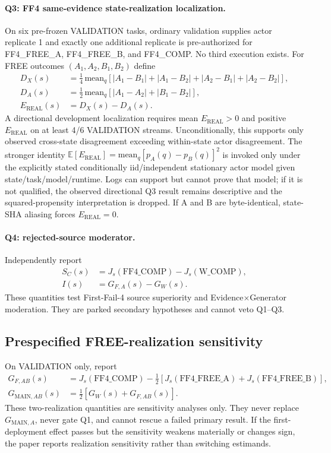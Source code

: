\paragraph{Q3: FF4 same-evidence state-realization localization.}
On six pre-frozen VALIDATION tasks, ordinary validation supplies actor replicate 1 and exactly one additional replicate is pre-authorized for FF4\_FREE\_A, FF4\_FREE\_B, and FF4\_COMP. No third execution exists. For FREE outcomes $(A_1,A_2,B_1,B_2)$ define
\begin{align}
D_X(s) &= \tfrac{1}{4}\,\mathrm{mean}_q\left[|A_1-B_1|+|A_1-B_2|+|A_2-B_1|+|A_2-B_2|\right],\\
D_A(s) &= \tfrac{1}{2}\,\mathrm{mean}_q\left[|A_1-A_2|+|B_1-B_2|\right],\\
E_{\mathrm{REAL}}(s) &= D_X(s)-D_A(s).
\end{align}
A directional development localization requires mean $E_{\mathrm{REAL}}>0$ and positive $E_{\mathrm{REAL}}$ on at least 4/6 VALIDATION streams. Unconditionally, this supports only observed cross-state disagreement exceeding within-state actor disagreement. The stronger identity $\mathbb{E}[E_{\mathrm{REAL}}]=\mathrm{mean}_q[p_A(q)-p_B(q)]^2$ is invoked only under the explicitly stated conditionally iid/independent stationary actor model given state/task/model/runtime. Logs can support but cannot prove that model; if it is not qualified, the observed directional Q3 result remains descriptive and the squared-propensity interpretation is dropped. If A and B are byte-identical, state-SHA aliasing forces $E_{\mathrm{REAL}}=0$.

\paragraph{Q4: rejected-source moderator.}
Independently report
\begin{align}
S_C(s) &= J_s(\text{FF4\_COMP})-J_s(\text{W\_COMP}),\\
I(s) &= G_{F,A}(s)-G_W(s).
\end{align}
These quantities test First-Fail-4 source superiority and Evidence$\times$Generator moderation. They are parked secondary hypotheses and cannot veto Q1--Q3.

\subsection{Prespecified FREE-realization sensitivity}
On VALIDATION only, report
\begin{align}
G_{F,AB}(s) &= J_s(\text{FF4\_COMP})-\tfrac{1}{2}[J_s(\text{FF4\_FREE\_A})+J_s(\text{FF4\_FREE\_B})],\\
G_{\mathrm{MAIN},AB}(s) &= \tfrac{1}{2}[G_W(s)+G_{F,AB}(s)].
\end{align}
These two-realization quantities are sensitivity analyses only. They never replace $G_{\mathrm{MAIN},A}$, never gate Q1, and cannot rescue a failed primary result. If the first-deployment effect passes but the sensitivity weakens materially or changes sign, the paper reports realization sensitivity rather than switching estimands.

